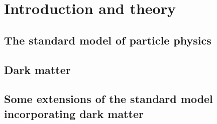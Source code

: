 \chapter{Introduction and theory}
\label{chap:theory}

\section{The standard model of particle physics}
\label{sec:SM}

\section{Dark matter}
\label{sec:DM}

\section{Some extensions of the standard model incorporating dark matter}
\label{sec:DMextensions}
